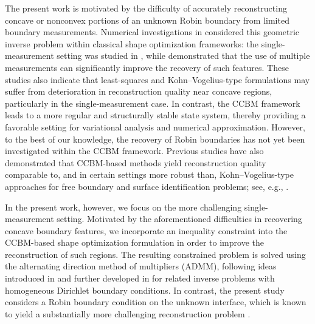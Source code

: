 \documentclass[a4paper,11pt]{article}
\begin{document}
The present work is motivated by the difficulty of accurately reconstructing concave or nonconvex portions of an unknown Robin boundary from limited boundary measurements. Numerical investigations in \cite{AfraitesRabago2024,AfraitesRabago2025} considered this geometric inverse problem within classical shape optimization frameworks: the single-measurement setting was studied in \cite{AfraitesRabago2024}, while \cite{AfraitesRabago2025} demonstrated that the use of multiple measurements can significantly improve the recovery of such features. These studies also indicate that least-squares and Kohn--Vogelius-type formulations may suffer from deterioration in reconstruction quality near concave regions, particularly in the single-measurement case.
In contrast, the CCBM framework leads to a more regular and structurally stable state system, thereby providing a favorable setting for variational analysis and numerical approximation. However, to the best of our knowledge, the recovery of Robin boundaries has not yet been investigated within the CCBM framework.
Previous studies have also demonstrated that CCBM-based methods yield reconstruction quality comparable to, and in certain settings more robust than, Kohn--Vogelius-type approaches for free boundary and surface identification problems; see, e.g., \cite{Rabago2023b,RabagoNotsu2024}.

In the present work, however, we focus on the more challenging single-measurement setting. 
Motivated by the aforementioned difficulties in recovering concave boundary features, we incorporate an inequality constraint into the CCBM-based shape optimization formulation in order to improve the reconstruction of such regions. 
The resulting constrained problem is solved using the alternating direction method of multipliers (ADMM), following ideas introduced in \cite{RabagoHadriAfraitesHendyZaky2024} and further developed in \cite{CherratAfraitesRabago2025b,CherratAfraitesRabago2026} for related inverse problems with homogeneous Dirichlet boundary conditions. 
In contrast, the present study considers a Robin boundary condition on the unknown interface, which is known to yield a substantially more challenging reconstruction problem \cite{AfraitesRabago2025}.
\end{document}
